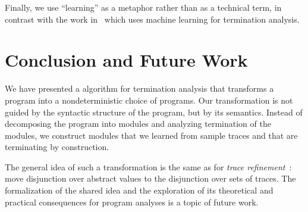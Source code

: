 Finally, we use ``learning'' as a metaphor rather than as a technical term, in contrast with the work in~\cite{lee2012termination} which uses machine learning for termination analysis.  
















\section{Conclusion and Future Work}
We have presented a algorithm for termination analysis that transforms a program into a nondeterministic choice of programs. 
Our transformation is not guided by the syntactic structure of the program, but by its semantics. 
Instead of decomposing the program into modules and analyzing termination of the modules, we construct modules that we learned from sample traces and that are terminating by construction.

The general idea of such a transformation is the same as for \emph{trace refinement}~\cite{conf/esop/MauborgneR05}: move disjunction over abstract values to the disjunction over sets of traces.  
The formalization of the shared idea and the exploration of its theoretical and practical consequences for program analyses is a topic of future work.
